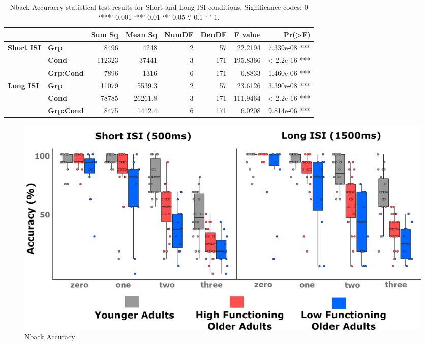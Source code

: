 \documentclass[a4paper,fleqn]{cas-sc}
\begin{document}
\begin{table}[h!]
\centering
\begin{tabular}{llrrrrrr}
\toprule
\multirow{2}{*}{}               & \multirow{2}{*}{}          & \textbf{Sum Sq}  & \textbf{Mean Sq} & \textbf{NumDF} & \textbf{DenDF} & \textbf{F value} & \textbf{Pr(>F)}          \\ 
\midrule
\multirow{3}{*}{\textbf{Short ISI}} 
                                & \textbf{Grp}              & 8496             & 4248             & 2              & 57             & 22.2194          & 7.339e-08 ***            \\
                                & \textbf{Cond}             & 112323           & 37441            & 3              & 171            & 195.8366         & < 2.2e-16 ***            \\
                                & \textbf{Grp:Cond}         & 7896             & 1316             & 6              & 171            & 6.8833           & 1.460e-06 ***            \\ 
\midrule
\multirow{3}{*}{\textbf{Long ISI}}
                                & \textbf{Grp}              & 11079            & 5539.3           & 2              & 57             & 23.6126          & 3.390e-08 ***            \\
                                & \textbf{Cond}             & 78785            & 26261.8          & 3              & 171            & 111.9464         & < 2.2e-16 ***            \\
                                & \textbf{Grp:Cond}         & 8475             & 1412.4           & 6              & 171            & 6.0208           & 9.814e-06 ***            \\ 
\bottomrule
\end{tabular}
\caption{Nback Accuracry statistical test results for Short and Long ISI conditions. Significance codes: 0 ‘***’ 0.001 ‘**’ 0.01 ‘*’ 0.05 ‘.’ 0.1 ‘ ’ 1.}
\label{tab:nback_accuracy}
\end{table}

\begin{figure}[ht]
    \centering
    \centering
    \includegraphics[clip, trim=0 0 0 0, width=\linewidth]{figs/nback_accuracy.png} %
    \caption{Nback Accuracy}
    \label{fig:accuracry}
\end{figure}
\end{document}
